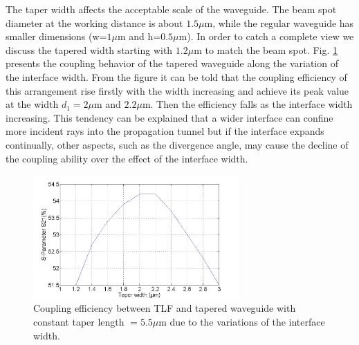 The taper width affects the acceptable scale of the waveguide. The beam spot diameter at the working distance is about $1.5\mu$m, while the regular waveguide has smaller dimensions (w=$1\mu$m and h=$0.5\mu$m). In order to catch a complete view we discuss the tapered width starting with $1.2\mu$m to match the beam spot. Fig. \ref{fig:tapered_waveguide_wxx} presents the coupling behavior of the tapered waveguide along the variation of the interface width. From the figure it can be told that the coupling efficiency of this arrangement rise firstly with the width increasing and achieve its peak value at the width $d_{1}=2\mu$m and $2.2\mu$m. Then the efficiency falls as the interface width increasing. This tendency can be explained that a wider interface can confine more incident rays into the propagation tunnel but if the interface expands continually, other aspects, such as the divergence angle, may cause the decline of the coupling ability over the effect of the interface width.\\ 

\begin{figure}[!ht]
\centering
\includegraphics[width=0.7\textwidth]{bilder/tapered_waveguide_wxx}
\caption{Coupling efficiency between TLF and tapered waveguide with constant taper length $= 5.5\mu$m due to the variations of the interface width.}
\label{fig:tapered_waveguide_wxx}
\end{figure}
